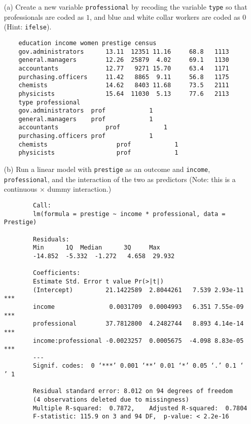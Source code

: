 \documentclass[12pt,letterpaper]{article}
\begin{document}
\newpage
\begin{enumerate}
	
	\item [(a)]
	Create a new variable \texttt{professional} by recoding the variable \texttt{type} so that professionals are coded as $1$, and blue and white collar workers are coded as $0$ (Hint: \texttt{ifelse}).
		
	\begin{verbatim} 
	education income women prestige census
	gov.administrators      13.11  12351 11.16     68.8   1113
	general.managers        12.26  25879  4.02     69.1   1130
	accountants             12.77   9271 15.70     63.4   1171
	purchasing.officers     11.42   8865  9.11     56.8   1175
	chemists                14.62   8403 11.68     73.5   2111
	physicists              15.64  11030  5.13     77.6   2113
	type professional
	gov.administrators  prof            1
	general.managers    prof            1
	accountants             prof            1
	purchasing.officers prof            1
	chemists                   prof            1
	physicists                 prof            1
   \end{verbatim}	

	\item [(b)]
	Run a linear model with \texttt{prestige} as an outcome and \texttt{income}, \texttt{professional}, and the interaction of the two as predictors (Note: this is a continuous $\times$ dummy interaction.)
      
	\begin{verbatim} 
		Call:
		lm(formula = prestige ~ income * professional, data = Prestige)
		
		Residuals:
		Min      1Q  Median      3Q     Max 
		-14.852  -5.332  -1.272   4.658  29.932 
		
		Coefficients:
		Estimate Std. Error t value Pr(>|t|)    
		(Intercept)         21.1422589  2.8044261   7.539 2.93e-11 ***
		income               0.0031709  0.0004993   6.351 7.55e-09 ***
		professional        37.7812800  4.2482744   8.893 4.14e-14 ***
		income:professional -0.0023257  0.0005675  -4.098 8.83e-05 ***
		---
		Signif. codes:  0 ‘***’ 0.001 ‘**’ 0.01 ‘*’ 0.05 ‘.’ 0.1 ‘ ’ 1
		
		Residual standard error: 8.012 on 94 degrees of freedom
		(4 observations deleted due to missingness)
		Multiple R-squared:  0.7872,	Adjusted R-squared:  0.7804 
		F-statistic: 115.9 on 3 and 94 DF,  p-value: < 2.2e-16
	\end{verbatim}	
	

\end{enumerate}
\end{document}
